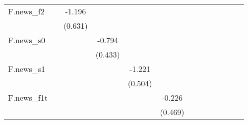 {\begin{tabular}{l*{12}{c}}
\addlinespace
F.news\_f2   &                     &      -1.196\sym{*}  &                     &                     &                     &                     &                     &                     &                     &                     &                     &                     \\
            &                     &     (0.631)         &                     &                     &                     &                     &                     &                     &                     &                     &                     &                     \\
\addlinespace
F.news\_s0   &                     &                     &      -0.794\sym{*}  &                     &                     &                     &                     &                     &                     &                     &                     &                     \\
            &                     &                     &     (0.433)         &                     &                     &                     &                     &                     &                     &                     &                     &                     \\
\addlinespace
F.news\_s1   &                     &                     &                     &      -1.221\sym{**} &                     &                     &                     &                     &                     &                     &                     &                     \\
            &                     &                     &                     &     (0.504)         &                     &                     &                     &                     &                     &                     &                     &                     \\
\addlinespace
F.news\_f1t  &                     &                     &                     &                     &      -0.226         &                     &                     &                     &                     &                     &                     &                     \\
            &                     &                     &                     &                     &     (0.469)         &                     &                     &                     &                     &                     &                     &                     \\

\end{tabular}}
